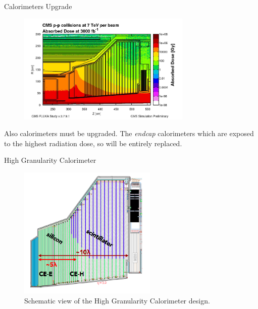 \documentclass[10pt]{beamer}
\begin{document}
\begin{frame}{Calorimeters Upgrade}
    
    \begin{figure}
        \centering
        \includegraphics[height=150pt]{img/upgrade/doseRad.png}
    \end{figure}{}
    
    Also calorimeters must be upgraded. The \emph{endcap} calorimeters which are exposed to the highest radiation dose, so will be entirely replaced.
\end{frame}

\begin{frame}{High Granularity Calorimeter}
    \begin{figure}
         \centering
         \includegraphics[height=180pt]{./img/upgrade/HGCalScheme.png}
         \caption{Schematic view of the High Granularity Calorimeter design.}
         \label{fig:my_label}
     \end{figure}{}
\end{frame}{}
\end{document}
